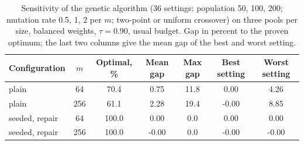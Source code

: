 \begin{table}[!htbp]
\centering
\caption{Sensitivity of the genetic algorithm (36 settings: population 50, 100, 200; mutation rate 0.5, 1, 2 per $m$; two-point or uniform crossover) on three pools per size, balanced weights, $\tau = 0.90$, usual budget. Gap in percent to the proven optimum; the last two columns give the mean gap of the best and worst setting.}
\label{tab:S-ga-sensitivity}
\footnotesize
\begin{tabular}{@{}lc ccc cc@{}}
\toprule
Configuration & $m$ & Optimal, \% & Mean gap & Max gap & Best setting & Worst setting \\
\midrule
plain & 64 & 70.4 & 0.75 & 11.8 & 0.00 & 4.26 \\
plain & 256 & 61.1 & 2.28 & 19.4 & -0.00 & 8.85 \\
seeded, repair & 64 & 100.0 & 0.00 & 0.0 & 0.00 & 0.00 \\
seeded, repair & 256 & 100.0 & -0.00 & 0.0 & -0.00 & -0.00 \\
\bottomrule
\end{tabular}
\end{table}
